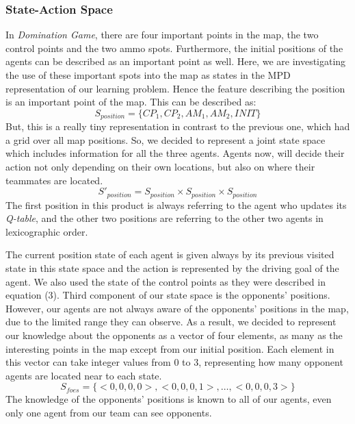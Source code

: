 \documentclass[conference]{IEEEtran}
\begin{document}
\subsubsection{State-Action Space}
In \textit{Domination Game}, there are four important points in the map, the two control points and the two ammo spots. Furthermore, the initial positions of the agents can be described as an important point as well. Here, we are investigating the use of these important spots into the map as states in the MPD representation of our learning problem. Hence the feature describing the position is an important point of the map. This can be described as:
\begin{equation}
S_{position} = \lbrace CP_1, CP_2, AM_1, AM_2, INIT  \rbrace
\end{equation}
But, this is a really tiny representation in contrast to the previous one, which had a grid over all map positions. So, we decided to represent a joint state space which includes information for all the three agents. Agents now, will decide their action not only depending on their own locations, but also on where their teammates are located.
\begin{equation}
S'_{position} = S_{position} \times S_{position} \times S_{position}
\end{equation}
The first position in this product is always referring to the agent who updates its \textit{Q-table}, and the other two positions are referring to the other two agents in lexicographic order.

The current position state of each agent is given always by its previous visited state in this state space and the action is represented by the driving goal of the agent. We also used the state of the control points as they were described in equation (3). Third component of our state space is the opponents' positions. However, our agents are not always aware of the opponents' positions in the map, due to the limited range they can observe. As a result, we decided to represent our knowledge about the opponents as a vector of four elements, as many as the interesting points in the map except from our initial position. Each element in this vector can take integer values from $0$ to $3$, representing how many opponent agents are located near to each state.
\begin{equation}
S_{foes} = \lbrace <0,0,0,0>, <0,0,0,1>, \ldots, <0,0,0,3>  \rbrace
\end{equation}
The knowledge of the opponents' positions is known to all of our agents, even only one agent from our team can see opponents.
\end{document}
